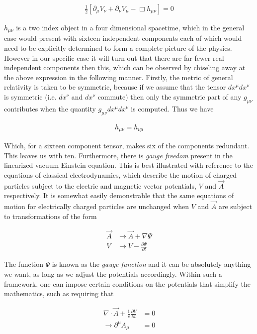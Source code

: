 \begin{align}
\frac{1}{2}\left[\partial_{\mu}V_{\nu} + \partial_{\nu}V_{\mu} - \Box h_{\mu \nu}\right] = 0 
\end{align}

$h_{\mu \nu}$ is a two index object in a four dimensional spacetime, which in the general case would present with sixteen independent components each of which would need to be explicitly determined to form a complete picture of the physics. However in our specific case it will turn out that there are far fewer real independent components then this, which can be observed by chiseling away at the above expression in the following manner. Firstly, the metric of general relativity is taken to be symmetric, because if we assume that the tensor $dx^{\mu}dx^{\nu}$ is symmetric (i.e. $dx^{\nu}$ and $dx^{\nu}$ commute) then only the symmetric part of any $g_{\mu \nu}$ contributes when the quantity $g_{\mu \nu}dx^{\mu}dx^{\nu}$ is computed. Thus we have 

\begin{align}
h_{\mu \nu} = h_{\nu \mu}
\end{align}

Which, for a sixteen component tensor, makes six of the components redundant. This leaves us with ten. Furthermore, there is \textit{gauge freedom} present in the linearized vacuum Einstein equation. This is best illustrated with reference to the equations of classical electrodynamics, which describe the motion of charged particles subject to the electric and magnetic vector potentials, $V$ and $\vec{A}$ respectively. It is somewhat easily demonstrable that the same equations of motion for electrically charged particles are unchanged when $V$ and $\vec{A}$ are subject to transformations of the form 

\begin{align}\label{eq:emtrans}
\vec{A} &\rightarrow \vec{A} + \nabla \Psi \\
V &\rightarrow V -\frac{\partial \Psi}{\partial t}
\end{align}  

The function $\Psi$ is known as the \textit{gauge function} and it can be absolutely anything we want, as long as we adjust the potentials accordingly. Within such a framework, one can impose certain conditions on the potentials that simplify the mathematics, such as requiring that 

\begin{align}\label{eq:emgauge}
\nabla \cdot \vec{A} + \frac{1}{c}\frac{\partial V}{\partial t} &= 0 \\
\rightarrow \partial^{\mu}A_{\mu} &= 0
\end{align}

